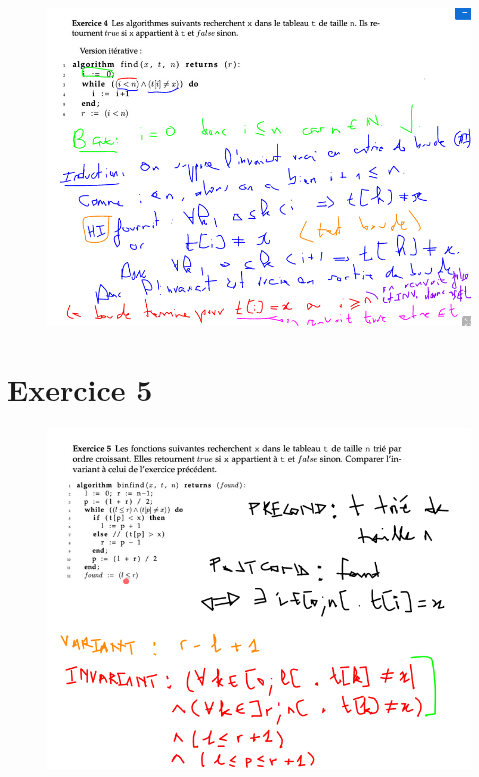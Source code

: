 \documentclass[a4paper]{article}
\begin{document}
\begin{figure}[!h]
  \centering
  \includegraphics[scale=0.5]{ex44_td5}
\end{figure}


\clearpage
\section*{Exercice 5}
\begin{figure}
  \centering
  \includegraphics[scale=0.5]{ex5_td5}
\end{figure}
\clearpage
\end{document}

